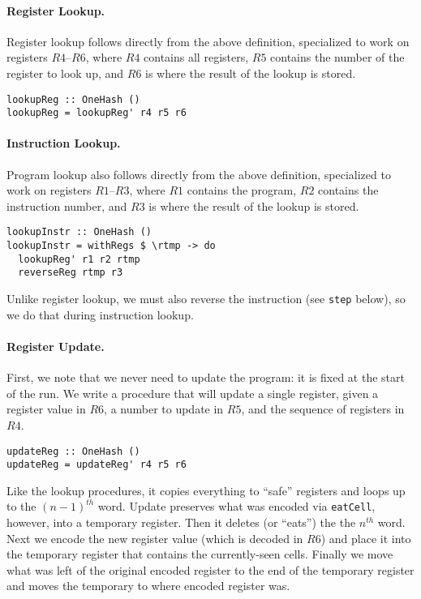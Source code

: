 \documentclass[10pt, preprint, nocopyrightspace]{sigplanconf}
\begin{document}
\paragraph{Register Lookup.}

Register lookup follows directly from the above definition, specialized to work on registers
$R4$--$R6$, where $R4$ contains all registers, $R5$ contains the number of the register to
look up, and $R6$ is where the result of the lookup is stored.

\begin{lstlisting}
lookupReg :: OneHash ()
lookupReg = lookupReg' r4 r5 r6
\end{lstlisting}

\paragraph{Instruction Lookup.}

Program lookup also follows directly from the above definition, specialized to
work on registers $R1$--$R3$, where $R1$ contains the program, $R2$ contains
the instruction number, and $R3$ is where the result of the lookup is stored.

\begin{lstlisting}
lookupInstr :: OneHash ()
lookupInstr = withRegs $ \rtmp -> do
  lookupReg' r1 r2 rtmp
  reverseReg rtmp r3
\end{lstlisting}

Unlike register lookup, we must also reverse the instruction (see
\lstinline{step} below), so we do that during instruction lookup.

\paragraph{Register Update.}

First, we note that we never need to update the program: it is fixed at the
start of the run. We write a procedure that will update a single register, given a register value in $R6$, a number to update in $R5$, and the sequence of registers in $R4$.

\begin{lstlisting}
updateReg :: OneHash ()
updateReg = updateReg' r4 r5 r6
\end{lstlisting}

Like the lookup procedures, it copies everything to ``safe'' registers and loops up to the
$(n-1)^{th}$ word. Update preserves what was encoded via \lstinline{eatCell},
however, into a temporary register.
Then it deletes (or ``eats'') the the $n^{th}$ word.
Next we encode the new register value (which is decoded in $R6$) and place it
into the temporary register that contains the currently-seen cells. Finally we
move what was left of the original encoded register to the end of the temporary
register and moves the temporary to where encoded register was. 
\end{document}
